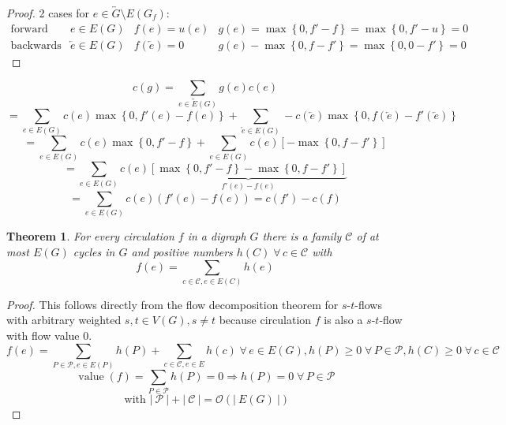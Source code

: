 \documentclass{article}
\newtheorem{theorem}{Theorem}
\newcommand{\card}[1]{\left|\:\!#1\:\!\right|}
\newcommand{\set}[1]{\left\{#1\right\}}
\newcommand{\flow}[2]{$#1$-$#2$-flow}
\newcommand{\fall}{\;\forall\,}
\begin{document}
\begin{proof}
  2 cases for $e \in \overleftrightarrow{G} \setminus E(G_f)$:
  \[
    \begin{array}{llll}
      \text{forward edge} & e \in E(G) & f(e) = u(e) & g(e) = \max\set{0, f' - f} = \max\set{0, f' - u} = 0 \\
      \text{backwards edge} & \overleftarrow{e} \in E(G) & f(\overleftarrow{e}) = 0 & g(e) - \max\set{0, f - f'} = \max\set{0, 0 - f'} = 0
    \end{array}
  \]
\end{proof}

\begin{equation*}
  c(g) = \sum_{e \in \overleftrightarrow{E}(G)} g(e) c(e)
\end{equation*} \begin{equation*}
    = \sum_{e \in E(G)} c(e) \max\set{0, f'(e) - f(e)} + \sum_{\overleftarrow{e} \in E(G)} -c(\overleftarrow{e}) \max\set{0, f(\overleftarrow{e}) - f'(\overleftarrow{e})}
\end{equation*} \begin{equation*}
    = \sum_{e \in E(G)} c(e) \max\set{0, f' - f} + \sum_{e \in E(G)} c(e) [-\max\set{0, f - f'}]
\end{equation*} \begin{equation*}
    = \sum_{e \in E(G)} c(e) \underbrace{
      \left[\max\set{0, f'-f} - \max\set{0, f - f'} \right]
    }_{f'(e) - f(e)}
\end{equation*} \begin{equation*}
    = \sum_{e \in E(G)} c(e) \left(f'(e) - f(e)\right) = c(f') - c(f)
\end{equation*}

\begin{theorem}\label{proposition-5.2}
  For every circulation $f$ in a digraph $G$ there is a family $\mathcal{C}$ of at most $E(G)$ cycles in $G$ and positive numbers $h(C) \fall c \in \mathcal{C}$ with
  \[
    f(e) = \sum_{c \in \mathcal{C}, e \in E(C)} h(e)
  \]
\end{theorem}

\begin{proof}
  This follows directly from the flow decomposition theorem for \flow sts with arbitrary weighted $s,t \in V(G), s \neq t$ because circulation $f$ is also a \flow st with flow value $0$.
  \[
    f(e) = \sum_{P \in \mathcal{P}, e \in E(P)} h(P) + \sum_{c \in \mathcal{C}, e \in E} h(c)
      \fall e \in E(G), h(P) \geq 0 \fall P \in \mathcal{P}, h(C) \geq 0 \fall c \in \mathcal{C}
  \] \[
    \operatorname{value}(f) = \sum_{P \in \mathcal{P}} h(P) = 0 \Rightarrow h(P) = 0 \fall P \in \mathcal{P}
  \] \[
    \text{ with } \card{\mathcal{P}} + \card{\mathcal{C}} = \mathcal{O}(\card{E(G)})
  \]
\end{proof}
\end{document}
